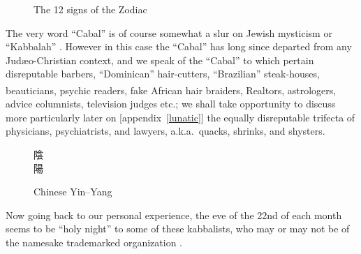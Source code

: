 \documentclass[letterpaper]{article}
\begin{document}
\begin{figure}
	\centering
	{\Huge {}}
	\caption{The 12 signs of the Zodiac}\label{zodiac}
\end{figure}
The very word ``Cabal'' is of course somewhat a slur on Jewish mysticism or ``Kabbalah'' \cite{kabbalah,ceasar2015}. However in this case the ``Cabal'' has long since departed from any Jud{\ae}o-Christian context, and we speak of the ``Cabal'' to which pertain disreputable barbers, ``Dominican'' hair-cutters, ``Brazilian'' steak-houses, beauticians, psychic readers, fake African hair braiders, Realtors\textsuperscript\textregistered, astrologers, advice columnists, television judges etc.;  we shall take opportunity to discuss more particularly later on [appendix~\ref{lunatic}] the equally disreputable trifecta of physicians, psychiatrists, and lawyers, a.k.a.\ quacks, shrinks, and shysters.

\begin{figure}
	\centering
	\begin{minipage}{1.25in}
		\centering
		\fontsize{1.25in}{1.25in}\selectfont
		\YinYang
	\end{minipage}
	\begin{minipage}{0.625in}
		\centering
		\fontsize{0.5in}{0.5in}\selectfont
		\begin{CJK}{UTF8}{bkai}陰\\陽\end{CJK}
	\end{minipage}
	\caption{Chinese Yin--Yang}
	\label{yinyang}
\end{figure}
Now going back to our personal experience, the eve of the 22nd of each month seems to be ``holy night'' to some of these kabbalists, who may or may not be of the namesake trademarked organization \cite{kabbalah}.
\end{document}

